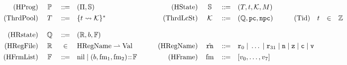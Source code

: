 \begin{figure*}[!t]
    \centering
    \[
        \begin{array}{rcclrcclrccl}
            \TYPE{(HProg)} & \ \HProg \ & \define & 
            (\HMd, \hpstate) &
            \TYPE{(HState)} & \hpstate & \define & 
            \multicolumn{3}{l}
            {
                (\thrdpool, \thrdid, \hthrdlocalst, \Mem)
            }
            \\
            \\[-8pt]
            \TYPE{(ThrdPool)} & \thrdpool & \define & 
            \{ \thrdid \rightsquigarrow \hthrdlocalst \}^{*}
            & \qquad
            \TYPE{(ThrdLcSt)} & \ \hthrdlocalst \ & \define & 
            (\hRstate, \pc, \npc) 
            & \qquad
            \TYPE{(Tid)} & \thrdid & \in & \Ztype \\
            \\
            \TYPE{(HRstate)} & \hRstate & \define & 
            (\hRfile, \block, \hWstk) \\
            \\[-8pt]
            \TYPE{(HRegFile)} & \hRfile & \in & 
            \TYPE{HRegName} \rightharpoonup \TYPE{Val} 
            & \qquad
            \TYPE{(HRegName)} & \hrn & \define & 
            \multicolumn{5}{l}
            {
                \reg{0} \sepline \dots \sepline \reg{31} \sepline 
                \regn \sepline \regz \sepline \regc \sepline \regv
            } \\
            \\[-8pt]
            \TYPE{(HFrmList)} & \hWstk & \define & 
            \nil \sepline (\block, \fm_1, \fm_2) \stCons \hWstk
            & \qquad
            \TYPE{(HFrame)} & \fm & \define & 
            [\val_0, \dots, \val_7]
        \end{array}
\]
\end{figure*}
